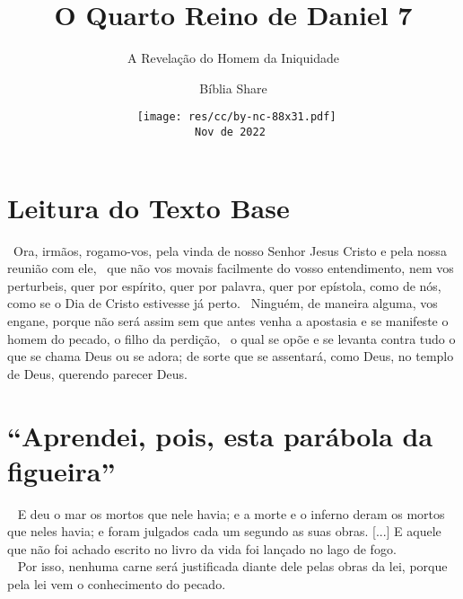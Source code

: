 \documentclass[12pt,aspectratio=169]{beamer}
\title{O Quarto Reino de Daniel 7}
\subtitle{A Revelação do Homem da Iniquidade}
\author{Bíblia Share}
\date[{\tiny\tt{Nov de 2022}}]{{\scriptsize\tt%
    \texttt{[image: res/cc/by-nc-88x31.pdf]}\\[\smallskipamount]
    Nov de 2022%
}}
\newcommand{\ver}[1]{%
    \raisebox{0.50ex}{%
        \scalebox{1.1}{%
            \pmb{\textbf{\textcolor{BSpbg}{#1}}}%
        }%
    }%
}
\newcommand{\QUOTE}[1]{%
    \par\noindent\hspace*{0.1\linewidth}%
    \begin{minipage}{0.8\linewidth}%
        \linespread{1.35}\large{#1}%
    \end{minipage}%
}
\newcommand{\WIDEQUOTE}[1]{%
    \par\noindent\hspace*{0.02\linewidth}%
    \begin{minipage}{0.92\linewidth}%
        \linespread{1.25}\large{#1}%
    \end{minipage}%
}
\newcommand{\RED}[1]{{\textcolor{TXred}{#1}}}
\begin{document}
\begin{frame}
    \titlepage
\end{frame}
\section{Leitura do Texto Base}

    \begin{frame}
        \WIDEQUOTE{%
            \ver{(ARC) 1Ts~2.1}~Ora, irmãos, rogamo-vos, pela vinda de  nosso  Senhor  Jesus
            Cristo e pela nossa reunião com ele, \ver{2}~que não vos  movais  facilmente  do
            vosso entendimento, nem vos perturbeis, quer por  espírito,  quer  por  palavra,
            quer por epístola, como de nós, como se o Dia de Cristo estivesse já perto.
            \ver{3}~Ninguém, de maneira alguma, vos engane, porque não será assim sem que antes
            venha a apostasia e se manifeste o homem do pecado, o filho da perdição, \ver{4}~o
            qual se opõe e se levanta contra tudo o que se chama Deus ou se adora; de sorte que
            se assentará, como Deus, no templo de Deus, querendo parecer Deus.
        }
    \end{frame}

\section{``Aprendei, pois, esta parábola da figueira''}

    \begin{frame}
        \QUOTE{%
            \ver{(ARC) Ap~20.13,15}~%
            E deu o mar os mortos que nele havia; e a morte e o inferno deram os mortos  que
            neles havia; \RED{e foram julgados cada um  segundo  as  suas  obras}.  [...]  E
            aquele que não foi achado escrito no livro da vida \RED{foi lançado no  lago  de
            fogo}.
            \\[\medskipamount]
            \ver{(ARC) Rm~3.20}~%
            Por isso, \RED{nenhuma carne será justificada diante dele pelas obras  da  lei},
            porque pela lei vem o conhecimento do pecado.
        }
    \end{frame}
\end{document}
